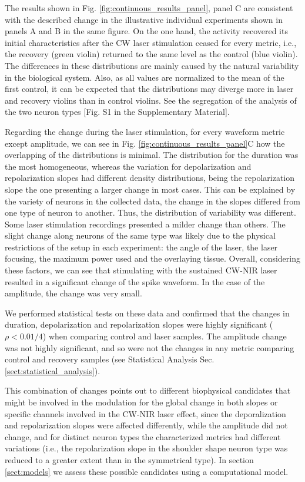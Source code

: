 The results shown in Fig. \ref{fig:continuous_results_panel}, panel C are consistent with the described change in the illustrative individual experiments shown in panels A and B in the same figure. On the one hand, the activity recovered its initial characteristics after the CW laser stimulation ceased for every metric, i.e., the recovery (green violin) returned to the same level as the control (blue violin). The differences in these distributions are mainly caused by the natural variability in the biological system. Also, as all values are normalized to the mean of the first control, it can be expected that the distributions may diverge more in laser and recovery violins than in control violins. See the segregation of the analysis of the two neuron types [Fig. S1 in the Supplementary Material].

Regarding the change during the laser stimulation, for every waveform metric except amplitude, we can see in Fig. \ref{fig:continuous_results_panel}C how the overlapping of the distributions is minimal. The distribution for the duration was the most homogeneous, whereas the variation for depolarization and repolarization slopes had different density distributions, being the repolarization slope the one presenting a larger change in most cases. This can be explained by the variety of neurons in the collected data, the change in the slopes differed from one type of neuron to another. Thus, the distribution of variability was different. Some laser stimulation recordings presented a milder change than others. The slight change along neurons of the same type was likely due to the physical restrictions of the setup in each experiment: the angle of the laser, the laser focusing, the maximum power used and the overlaying tissue. Overall, considering these factors, we can see that stimulating with the sustained CW-NIR laser resulted in a significant change of the spike waveform. In the case of the amplitude, the change was very small. 

We performed statistical tests on these data and confirmed that the changes in duration, depolarization and repolarization slopes were highly significant ($\rho < 0.01 /4$) when comparing control and laser samples. The amplitude change was not highly significant, and so were not the changes in any metric comparing control and recovery samples (see Statistical Analysis Sec. \ref{sect:statistical_analysis}).

This combination of changes points out to different biophysical candidates that might be involved in the modulation for the global change in both slopes or specific channels involved in the CW-NIR laser effect, since the deporalization and repolarization slopes were affected differently, while the amplitude did not change, and for distinct neuron types the characterized metrics had different variations (i.e., the repolarization slope in the shoulder shape neuron type was reduced to a greater extent than in the symmetrical type). In section \ref{sect:models} we assess these possible candidates using a computational model. 

